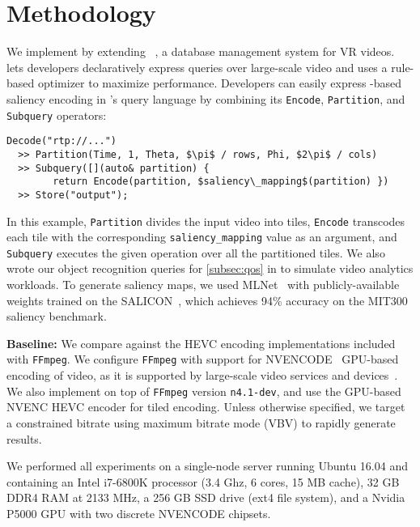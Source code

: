 
\section{Methodology}
\label{sec:vignette-methodology}

We implement \name by extending \lightdb~\cite{lightdb}, a database management system for VR videos.
\lightdb{} lets developers declaratively express queries over large-scale video and uses a rule-based optimizer to maximize performance.
Developers can easily express \hevc-based saliency encoding in \lightdb's query language by combining its \texttt{Encode}, \texttt{Partition}, and \texttt{Subquery} operators:
\begin{lstlisting}[style=VRQL]
Decode("rtp://...")
  >> Partition(Time, 1, Theta, $\pi$ / rows, Phi, $2\pi$ / cols)
  >> Subquery([](auto& partition) {
        return Encode(partition, $saliency\_mapping$(partition) })
  >> Store("output");
\end{lstlisting}

\noindent In this example, \texttt{Partition} divides the input video into tiles, \texttt{Encode} transcodes each tile with the corresponding \texttt{saliency\_mapping} value as an argument, and  \texttt{Subquery} executes the given operation over all the partitioned tiles.
We also wrote our object recognition queries for \ref{subsec:qos} in \lightdb to simulate video analytics workloads.
To generate saliency maps, we used MLNet~\cite{mlnet2016} with publicly-available weights trained on the SALICON~\cite{huang2015salicon}, which achieves 94\% accuracy on the MIT300 saliency benchmark.

\noindent\textbf{Baseline: } We compare \name against the HEVC encoding implementations included with \texttt{FFmpeg}.
We configure \texttt{FFmpeg} with support for NVENCODE~\cite{nvenc} GPU-based encoding of \hevc video, as it is supported by large-scale video services and devices~\cite{de2016large}.
We also implement \nameCompress on top of \texttt{FFmpeg} version \texttt{n4.1-dev}, and use the GPU-based NVENC HEVC encoder for tiled encoding.
Unless otherwise specified, we target a constrained bitrate using maximum bitrate mode (VBV) to rapidly generate results.

We performed all experiments on a single-node server running Ubuntu 16.04 and containing an Intel i7-6800K processor (3.4 Ghz, 6 cores, 15 MB cache), 32 GB DDR4 RAM at 2133 MHz, a 256 GB SSD drive (ext4 file system), and a Nvidia P5000 GPU with two discrete NVENCODE chipsets.

